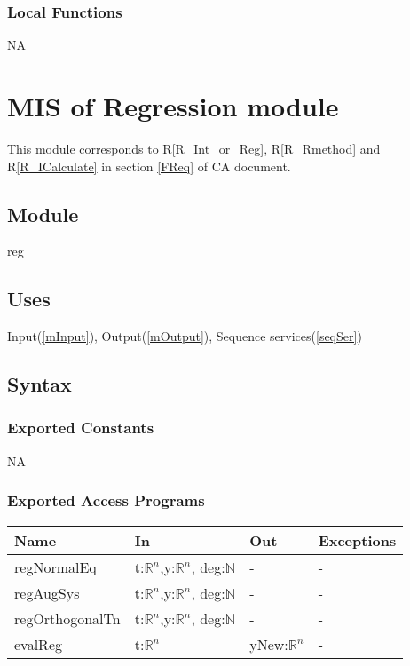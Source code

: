 \documentclass[12pt, titlepage]{article}
\begin{document}
\subsubsection{Local Functions}

NA





\section{MIS of Regression module} \label{mReg}

This module corresponds to R\ref{R_Int_or_Reg}, R\ref{R_Rmethod} and 
R\ref{R_ICalculate} in section \ref{FReq} of CA document.


\subsection{Module}

reg

\subsection{Uses}

Input(\ref{mInput}), Output(\ref{mOutput}), Sequence services(\ref{seqSer})


\subsection{Syntax}

\subsubsection{Exported Constants}


NA

\subsubsection{Exported Access Programs}

\begin{center}
	\begin{tabular}{p{4cm} p{4cm} p{4cm} p{1cm}}
		\hline
		\textbf{Name} & \textbf{In} & \textbf{Out} & \textbf{Exceptions} \\
		\hline
		regNormalEq & t:$\mathbb{R}^n$,y:$\mathbb{R}^n$, deg:$\mathbb{N}$  & 
		- & - \\
		regAugSys & t:$\mathbb{R}^n$,y:$\mathbb{R}^n$, deg:$\mathbb{N}$ & -
		& - \\
		regOrthogonalTn & t:$\mathbb{R}^n$,y:$\mathbb{R}^n$,  
		deg:$\mathbb{N}$ & -
		& - \\
		evalReg & t:$\mathbb{R}^n$ & yNew:$\mathbb{R}^n$ & - \\
		
		\hline
	\end{tabular}
\end{center}
\end{document}
